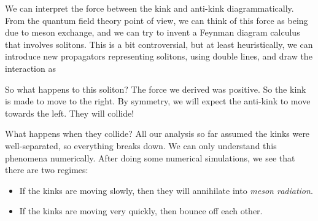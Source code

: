 \documentclass[a4paper]{article}
\begin{document}
We can interpret the force between the kink and anti-kink diagrammatically. From the quantum field theory point of view, we can think of this force as being due to meson exchange, and we can try to invent a Feynman diagram calculus that involves solitons. This is a bit controversial, but at least heuristically, we can introduce new propagators representing solitons, using double lines, and draw the interaction as
\begin{center}
\end{center}
%

So what happens to this soliton? The force we derived was positive. So the kink is made to move to the right. By symmetry, we will expect the anti-kink to move towards the left. They will collide!

What happens when they collide? All our analysis so far assumed the kinks were well-separated, so everything breaks down. We can only understand this phenomena numerically. After doing some numerical simulations, we see that there are two regimes:
\begin{itemize}
  \item If the kinks are moving slowly, then they will annihilate into \emph{meson radiation}.
  \item If the kinks are moving very quickly, then bounce off each other.
\end{itemize}
%
\end{document}
